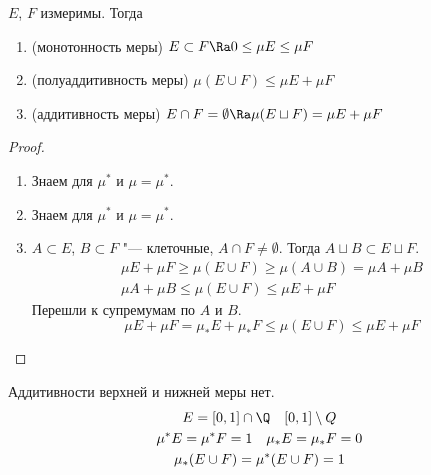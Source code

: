 \begin{theorem}
	$E$, $F$ измеримы.
	Тогда
	\begin{enumerate}
		\item (монотонность меры) $E \subset F \Ra 0 \le \mu E \le \mu F$
		\item (полуаддитивность меры) $\mu (E \cup F) \le \mu E + \mu F$
		\item (аддитивность меры) $E \cap F = \emptyset \Ra \mu(E \sqcup F) = \mu E + \mu F$
	\end{enumerate}
\end{theorem}
\begin{proof}
	\begin{enumerate}
	\item
		Знаем для $\mu^*$ и $\mu = \mu^*$.

	\item
		Знаем для $\mu^*$ и $\mu = \mu^*$.

	\item
		$A \subset E$, $B \subset F$ "--- клеточные, $A \cap F \ne \emptyset$.
		Тогда $A \sqcup B \subset E \sqcup F$.
		\begin{gather*}
			\mu E + \mu F \ge \mu(E \cup F) \ge \mu(A \cup B) = \mu A + \mu B \\
			\mu A + \mu B \le \mu (E \cup F) \le \mu E + \mu F
		\end{gather*}
		Перешли к супремумам по $A$ и $B$.
		\[
			\mu E + \mu F = \mu_* E + \mu_* F \le \mu (E \cup F) \le \mu E + \mu F
		\]
	\end{enumerate}
\end{proof}

\begin{Rem}
	Аддитивности верхней и нижней меры нет.
	\begin{gather*}
		E = [0, 1] \cap \Q \quad [0, 1] \setminus Q \\
		\mu^* E = \mu^* F = 1 \quad \mu_* E = \mu_* F = 0 \\
		\mu_*(E \cup F) = \mu^* (E \cup F) = 1
	\end{gather*}
\end{Rem}
